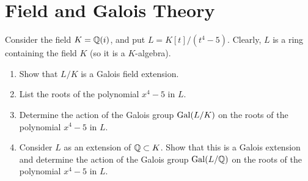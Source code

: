 \section{Field and Galois Theory}

\begin{question}[subtitle = January 2026 Problem 3,ID=Jan26_3]
Consider the field $K = \mathbb{Q}(i)$, and put $L = K[t]/(t^4 - 5)$. Clearly, $L$ is a ring containing the field $K$ (so it is a $K$-algebra).
\begin{enumerate}
    \item Show that $L/K$ is a Galois field extension.
    \item List the roots of the polynomial $x^4 - 5$ in $L$.
    \item Determine the action of the Galois group $\operatorname{Gal}(L/K)$ on the roots of the polynomial $x^4 - 5$ in $L$.
    \item Consider $L$ as an extension of $\mathbb{Q} \subset K$. Show that this is a Galois extension and determine the action of the Galois group $\operatorname{Gal}(L/\mathbb{Q})$ on the roots of the polynomial $x^4 - 5$ in $L$.
\end{enumerate}
\end{question}
